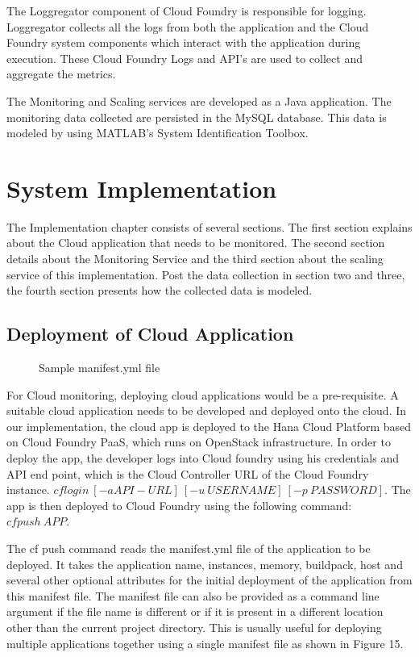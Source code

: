 \documentclass[article,type=msc,colorback,12pt,accentcolor=tud7b]{tudthesis}
\begin{document}
	The Loggregator component of Cloud Foundry is responsible for logging. Loggregator collects all the logs from both the application and the Cloud Foundry system components which interact with the application during execution. These Cloud Foundry Logs and API's are used to collect and aggregate the metrics. 
	
	The Monitoring and Scaling services are developed as a Java application. The monitoring data collected are persisted in the MySQL database. This data is modeled by using MATLAB's System Identification Toolbox.


 \cleardoublepage
 \section{System Implementation}
The Implementation chapter consists of several sections. The first section explains about the Cloud application that needs to be monitored. The second section details about the Monitoring Service and the third section about the scaling service of this implementation. Post the data collection in section two and three, the fourth section presents how the collected data is modeled. 
 
	\subsection{Deployment of Cloud Application} 

 \begin{figure}[!h]
 	\begin{center}
 		\makebox[\textwidth]{\texttt{[image: D2]}}
 	\end{center}
 	\caption{Sample manifest.yml file}
 \end{figure}
	
	For Cloud monitoring, deploying cloud applications would be a pre-requisite. A suitable cloud application needs to be developed and deployed onto the cloud. In our implementation, the cloud app is deployed to the Hana Cloud Platform based on Cloud Foundry PaaS, which runs on OpenStack \cite{openstack} infrastructure. In order to deploy the app, the developer logs into Cloud foundry using his credentials and API end point, which is the Cloud Controller URL of the Cloud Foundry instance. $ cf login \: [-a API-URL] \: [-u \: USERNAME] \: [-p \: PASSWORD] $. The app is then deployed to Cloud Foundry using the following command: $ cf push \: APP $.		

The cf push command reads the manifest.yml file of the application to be deployed. It takes the application name, instances, memory, buildpack, host and several other optional attributes for the initial deployment of the application from this manifest file. The manifest file can also be provided as a command line argument if the file name is different or if it is present in a different location other than the current project directory. This is usually useful for deploying multiple applications together using a single manifest file as shown in Figure 15.
	
\end{document}

